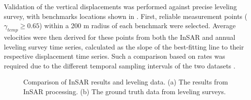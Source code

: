 Validation of the vertical displacements was performed against precise leveling survey, with benchmarks locations shown in . First, reliable measurement points ($\gamma_\textit{temp} \ge 0.65$) within a 200 m radius of each benchmark were selected. Average velocities were then derived for these points from both the InSAR and annual leveling survey time series, calculated as the slope of the best-fitting line to their respective displacement time series. Such a comparison based on rates was required due to the different temporal sampling intervals of the two datasets .

\begin{figure}[H]
	\centering
	
	\begin{subfigure}[b]{0.3\textwidth}
		\centering
		\framebox{\rule{0pt}{8cm}\rule{\textwidth}{0pt}}
		\caption{} %
		\label{fig:insar_leveling_a} %
	\end{subfigure}
	\quad
	\begin{subfigure}[b]{0.3\textwidth}
		\centering
		\framebox{\rule{0pt}{8cm}\rule{\textwidth}{0pt}}
		\caption{} %
		\label{fig:insar_leveling_b} %
	\end{subfigure}
	
	\caption{Comparison of InSAR results and leveling data. (a) The results from InSAR processing. (b) The ground truth data from leveling surveys.}
	\label{fig:insar_leveling} %
\end{figure}



